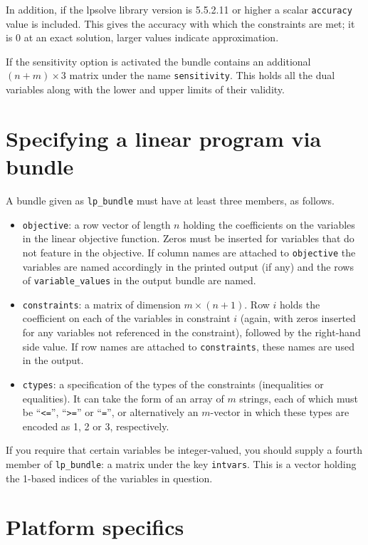 \documentclass{article}
\begin{document}
In addition, if the \textsf{lpsolve} library version is 5.5.2.11 or
higher a scalar \texttt{accuracy} value is included. This gives the
accuracy with which the constraints are met; it is 0 at an exact
solution, larger values indicate approximation.

If the sensitivity option is activated the bundle contains an
additional $(n+m) \times 3$ matrix under the name
\texttt{sensitivity}. This holds all the dual variables along with the
lower and upper limits of their validity.

\section{Specifying a linear program via bundle}
\label{sec:lp-bundle}

A bundle given as \texttt{lp\_bundle} must have at least three
members, as follows.
\begin{itemize}
\item \texttt{objective}: a row vector of length $n$ holding the
  coefficients on the variables in the linear objective
  function. Zeros must be inserted for variables that do not feature
  in the objective. If column names are attached to
  \texttt{objective} the variables are named accordingly in the
  printed output (if any) and the rows of \texttt{variable\_values}
  in the output bundle are named.
\item \texttt{constraints}: a matrix of dimension $m \times
  (n+1)$. Row $i$ holds the coefficient on each of the variables in
  constraint $i$ (again, with zeros inserted for any variables not
  referenced in the constraint), followed by the right-hand side
  value. If row names are attached to \texttt{constraints}, these
  names are used in the output.
\item \texttt{ctypes}: a specification of the types of the constraints
  (inequalities or equalities). It can take the form of an array of
  $m$ strings, each of which must be ``\texttt{<=}'', ``\texttt{>=}''
  or ``\texttt{=}'', or alternatively an $m$-vector in which these
  types are encoded as 1, 2 or 3, respectively.
\end{itemize}

If you require that certain variables be integer-valued, you should
supply a fourth member of \texttt{lp\_bundle}: a matrix under the key
\texttt{intvars}. This is a vector holding the 1-based indices of the
variables in question.

\section{Platform specifics}
\label{sec:platforms}
\end{document}
